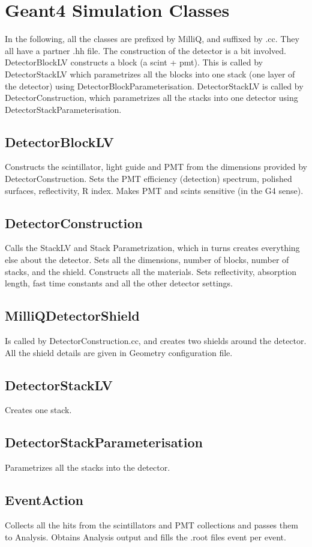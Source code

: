 \documentclass[prd,noshowpacs,nofootinbib,amsmath,amssymb,superscriptaddress]{revtex4}
\begin{document}
\section{Geant4 Simulation Classes}
In the following, all the classes are prefixed by MilliQ, and suffixed by .cc. They all have a partner .hh file.
The construction of the detector is a bit involved. DetectorBlockLV constructs a block (a scint + pmt). This is called by 
DetectorStackLV which parametrizes all the blocks into one stack (one layer of the detector) using DetectorBlockParameterisation.
DetectorStackLV is called by DetectorConstruction, which parametrizes all the stacks into one detector using DetectorStackParameterisation.
\subsection{DetectorBlockLV}
Constructs the scintillator, light guide and PMT from the dimensions provided by DetectorConstruction. 
Sets the PMT efficiency (detection) spectrum, polished surfaces, reflectivity, R index. 
Makes PMT and scints sensitive (in the G4 sense).
\subsection{DetectorConstruction}
Calls the StackLV and Stack Parametrization, which in turns creates everything else about the detector.
Sets all the dimensions, number of blocks, number of stacks, and the shield. Constructs all the materials.
Sets reflectivity, absorption length, fast time constants and all the other detector settings.
\subsection{MilliQDetectorShield}
Is called by DetectorConstruction.cc, and creates two shields around the detector. All the shield details are given in Geometry configuration file.
\subsection{DetectorStackLV}
Creates one stack.
\subsection{DetectorStackParameterisation}
Parametrizes all the stacks into the detector.
\subsection{EventAction}
Collects all the hits from the scintillators and PMT collections and passes them to Analysis. Obtains Analysis output and fills the 
.root files event per event.
\end{document}
